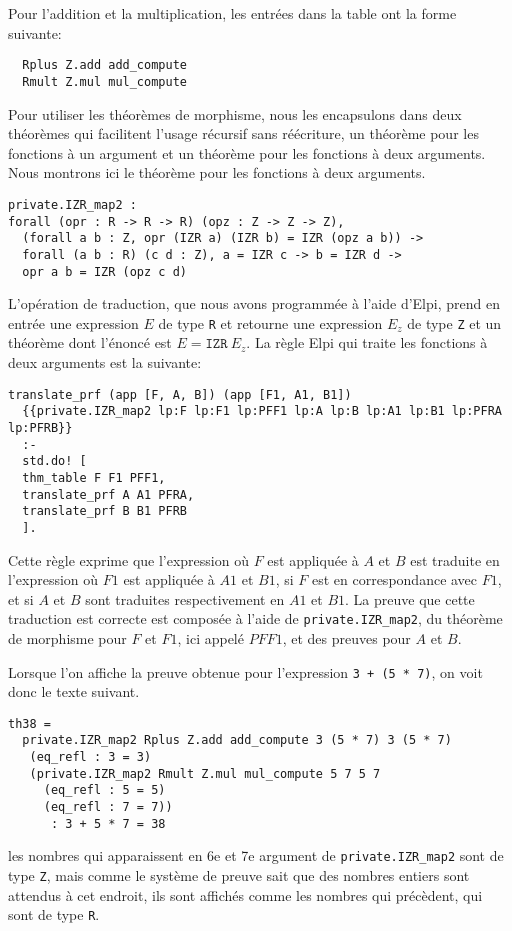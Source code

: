 \documentclass[draft]{jflart}
\begin{document}
Pour l'addition et la multiplication, les entrées dans la table ont
 la forme suivante:
\begin{verbatim}
  Rplus Z.add add_compute
  Rmult Z.mul mul_compute
\end{verbatim}

Pour utiliser les théorèmes de morphisme, nous les encapsulons dans deux
théorèmes qui facilitent l'usage récursif sans réécriture, un théorème
pour les fonctions à un argument et un théorème pour les fonctions à deux
arguments.  Nous montrons ici le théorème pour les fonctions à deux arguments.

\begin{verbatim}
private.IZR_map2 :
forall (opr : R -> R -> R) (opz : Z -> Z -> Z),
  (forall a b : Z, opr (IZR a) (IZR b) = IZR (opz a b)) ->
  forall (a b : R) (c d : Z), a = IZR c -> b = IZR d ->
  opr a b = IZR (opz c d)
\end{verbatim}

L'opération de traduction, que nous avons programmée à l'aide d'Elpi,
prend en entrée une expression \(E\) de type \texttt{R} et retourne une
expression \(E_z\) de type \texttt{Z} et un théorème dont l'énoncé est
\(E = \texttt{IZR}~E_z\).  La règle Elpi qui traite les fonctions à deux
arguments est la suivante:

\begin{verbatim}
translate_prf (app [F, A, B]) (app [F1, A1, B1])
  {{private.IZR_map2 lp:F lp:F1 lp:PFF1 lp:A lp:B lp:A1 lp:B1 lp:PFRA lp:PFRB}}
  :-
  std.do! [
  thm_table F F1 PFF1,
  translate_prf A A1 PFRA,
  translate_prf B B1 PFRB
  ].
\end{verbatim}

Cette règle exprime que l'expression où \(F\) est appliquée à \(A\) et
\(B\) est traduite en l'expression où \(F1\) est appliquée à \(A1\) et
\(B1\), si \(F\) est en correspondance avec \(F1\), et si \(A\) et
\(B\) sont traduites respectivement en \(A1\) et \(B1\).  La preuve
que cette traduction est correcte est composée à l'aide de
 \texttt{private.IZR\_map2}, du théorème de morphisme pour \(F\) et \(F1\),
ici appelé \(PFF1\), et des preuves pour \(A\) et \(B\).

Lorsque l'on affiche la preuve obtenue pour l'expression \texttt{3 + (5 *
  7)}, on voit donc le texte suivant.
\begin{verbatim}
th38 =
  private.IZR_map2 Rplus Z.add add_compute 3 (5 * 7) 3 (5 * 7)
   (eq_refl : 3 = 3)
   (private.IZR_map2 Rmult Z.mul mul_compute 5 7 5 7 
     (eq_refl : 5 = 5)
     (eq_refl : 7 = 7))
      : 3 + 5 * 7 = 38
\end{verbatim}
les nombres qui apparaissent en 6e et 7e argument de
\texttt{private.IZR\_map2} sont de type \texttt{Z}, mais comme le système de
preuve sait que des nombres entiers sont attendus à cet endroit, ils
sont affichés comme les nombres qui précèdent, qui sont de type
\texttt{R}.
\end{document}
